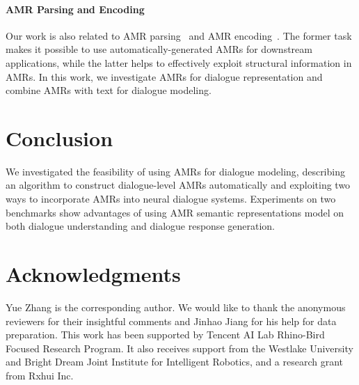 \documentclass[11pt,a4paper]{article}
\begin{document}
\paragraph{AMR Parsing and Encoding}
Our work is also related to AMR parsing~\cite{flanigan-etal-2014-discriminative,KonstasIYCZ17,TitovL18,guo-lu-2018-better,zhang-etal-2019-amr,cai-lam-2020-amr} and AMR encoding~\cite{konstas2017neural,song2018graph,zhu2019modeling,song-etal-2020-structural,zhao-etal-2020-line,bai-etal-2020-online}.
The former task makes it possible to use automatically-generated AMRs for downstream applications, while the latter helps to effectively exploit structural information in AMRs.
In this work, we investigate AMRs for dialogue representation and combine AMRs with text for dialogue modeling.



\section{Conclusion}
We investigated the feasibility of using AMRs for dialogue modeling, describing an algorithm to construct dialogue-level AMRs automatically and exploiting two ways to incorporate AMRs into neural dialogue systems. 
Experiments on two benchmarks show advantages of using AMR semantic representations model on both dialogue understanding and dialogue response generation.

\section*{Acknowledgments}
Yue Zhang is the corresponding author. 
We would like to thank the anonymous reviewers for their insightful comments and Jinhao Jiang for his help for data preparation.
This work has been supported by Tencent AI Lab Rhino-Bird Focused Research Program.
It also receives support from the Westlake University and Bright Dream Joint Institute for Intelligent Robotics, and a research grant from Rxhui Inc.






\end{document}
